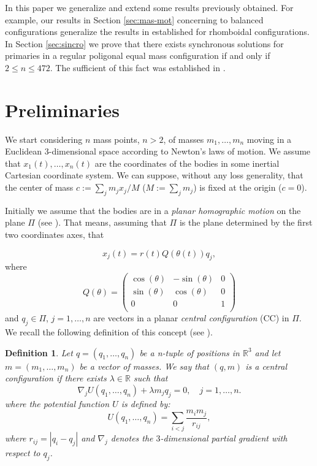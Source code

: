 \documentclass[twoside]{article}
\newtheorem{defi}[thm]{Definition}
\theoremstyle{remark}
\newcommand{\rr}{\mathbb{R}}
\newcounter{example}
\begin{document}
In this paper we generalize and extend some results previously obtained. For example, our results in Section \ref{sec:mas-mot} concerning to balanced configurations   generalize the results  in \cite{marchesin2013spatial} established for rhomboidal configurations. In Section \ref{sec:sincro} we prove that there exists synchronous solutions for primaries in a regular poligonal equal mass configuration if and only if $2\leq n\leq 472$. The sufficient of this fact was established in \cite{li2013characterization}.


\section{Preliminaries}\label{sec:pre}

We start considering $n$  mass points, $n>2$, of masses $m_1,\ldots,m_n$ moving in a Euclidean 3-dimensional space according to Newton's laws of motion. We assume that $x_1(t),\ldots,x_n(t)$ are the coordinates of the bodies in some inertial Cartesian coordinate system.  We can suppose, without any loss generality, that the center of mass   $c:=\sum_jm_jx_j/M$ ($M:=\sum_j m_j$) is fixed at the origin ($c=0$).

Initially we assume that the bodies are in a \emph{planar homographic motion} on the plane $\Pi$ (see \cite{JaumeLlibre276}). That means, assuming that  $\Pi$ is the plane determined by the first two coordinates axes, that

\begin{equation}\label{eq:x_j=rtQtq_j}
 x_j(t)=r(t)Q(\theta (t))q_j,
\end{equation}
where
\[
 Q(\theta )=\begin{pmatrix}
           \cos(\theta ) & -\sin(\theta ) & 0\\
           \sin(\theta ) & \cos(\theta ) & 0\\
           0            &     0     &  1\\
          \end{pmatrix}
\]
and $q_j\in\Pi$, $j=1,\ldots,n$ are vectors in a planar \emph{central configuration} (CC) in $\Pi$. We recall the following definition of this concept (see \cite{JaumeLlibre276}).

\begin{defi}\label{def:CC}
Let $q=(q_1,\ldots,q_n)$ be  a n-tuple of positions in $\rr^3$ and let $m=(m_1,\ldots,m_n)$ be a vector of masses. We say that $(q,m)$ is a central configuration if
there exists $\lambda\in\rr$ such that
\begin{equation}\label{eq:def.CC}
\nabla_jU(q_1,\ldots,q_n)+\lambda m_jq_j=0,\quad j=1,\ldots,n.
\end{equation}
where the \emph{potential function} $U$ is defined by:
\begin{equation}\label{eq:potencial}
 U(q_1,\ldots,q_n)=\sum_{i<j}\frac{m_im_j}{r_{ij}},
\end{equation}
where $r_{ij}=|q_i-q_j|$ and $\nabla_j$ denotes the $3$-dimensional partial gradient with respect to $q_j$.
\end{defi}
\end{document}
